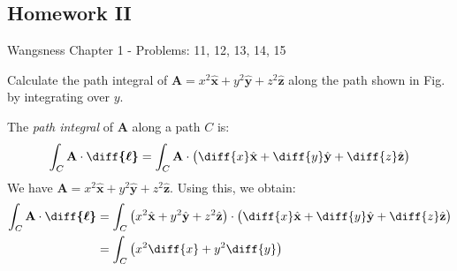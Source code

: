 \documentclass[crop=false,class=book,oneside]{standalone}
\begin{document}
        \subsection{Homework II}
            Wangsness Chapter 1 - Problems: 11, 12, 13, 14, 15
            \begin{problem}[Wangsness 1-11]
                \label{problem:EMAG_1_Wangsness_1_11}
                Calculate the path integral of
                $\mathbf{A}=x^{2}\hat{\mathbf{x}}
                +y^{2}\hat{\mathbf{y}}+z^{2}\hat{\mathbf{z}}$
                along the path shown in
                Fig.~
                by integrating over $y$.
            \end{problem}
            \begin{solution}
                The \textit{path integral} of $\mathbf{A}$
                along a path $C$ is:
                \begin{equation}
                    \int_{C}\mathbf{A}
                    \cdot\boldsymbol{\diff{\ell}}
                    =\int_{C}\mathbf{A}\cdot\big(
                        \diff{x}\hat{\mathbf{x}}
                       +\diff{y}\hat{\mathbf{y}}
                       +\diff{z}\hat{\mathbf{z}}
                    \big)
                \end{equation}
                We have
                $\mathbf{A}%
                 =x^{2}\hat{\mathbf{x}}%
                 +y^{2}\hat{\mathbf{y}}%
                 +z^{2}\hat{\mathbf{z}}$.
                Using this, we obtain:
                \begin{subequations}
                    \begin{align}
                        \int_{C}\mathbf{A}\cdot
                        \boldsymbol{\diff{\ell}}
                        &=\int_{C}\big(
                            x^{2}\hat{\mathbf{x}}+y^{2}
                            \hat{\mathbf{y}}+z^{2}\hat{\mathbf{z}}
                        \big)
                        \cdot\big(
                             \diff{x}\hat{\mathbf{x}}
                            +\diff{y}\hat{\mathbf{y}}
                            +\diff{z}\hat{\mathbf{z}}
                        \big)\\
                        &=\int_{C}
                            \big(x^{2}\diff{x}+y^{2}\diff{y}\big)
                    \end{align}
                \end{subequations}

\end{solution}
\end{document}

